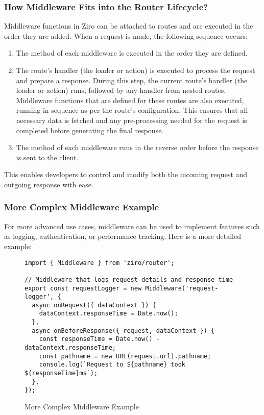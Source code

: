 \subsubsection*{How Middleware Fits into the Router Lifecycle?}
Middleware functions in Ziro can be attached to routes and are executed in the order they are added. When a request is made, the following sequence occurs:
\begin{enumerate}
  \item The  method of each middleware is executed in the order they are defined.
  \item The route’s handler (the loader or action) is executed to process the request and prepare a response. During this step, the current route's handler (the loader or action) runs, followed by any handler from nested routes. Middleware functions that are defined for these routes are also executed, running in sequence as per the route's configuration. This ensures that all necessary data is fetched and any pre-processing needed for the request is completed before generating the final response.
  \item The  method of each middleware runs in the reverse order before the response is sent to the client.
\end{enumerate}
This enables developers to control and modify both the incoming request and outgoing response with ease.

\pagebreak
\subsubsection*{More Complex Middleware Example}
For more advanced use cases, middleware can be used to implement features such as logging, authentication, or performance tracking. Here is a more detailed example:
\begin{figure}[h!]
\begin{verbatim}
import { Middleware } from 'ziro/router';

// Middleware that logs request details and response time
export const requestLogger = new Middleware('request-logger', {
  async onRequest({ dataContext }) {
    dataContext.responseTime = Date.now();
  },
  async onBeforeResponse({ request, dataContext }) {
    const responseTime = Date.now() - dataContext.responseTime;
    const pathname = new URL(request.url).pathname;
    console.log(`Request to ${pathname} took ${responseTime}ms`);
  },
});
\end{verbatim}
\caption{More Complex Middleware Example}
\end{figure}

